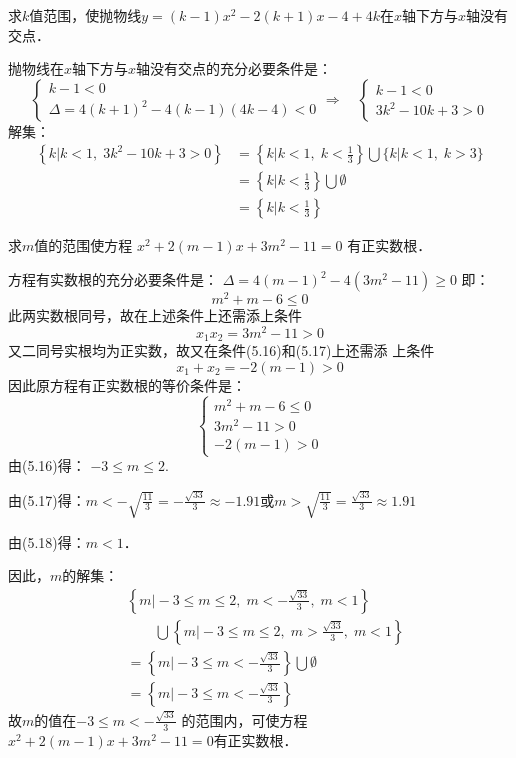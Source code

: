 \begin{example}
    求$k$值范围，使抛物线$y=(k-1)x^2-2(k+1)x-4+4k$在$x$轴下方与$x$轴没有交点．
\end{example}

\begin{solution}
    抛物线在$x$轴下方与$x$轴没有交点的充分必要条件是：
\[\begin{cases}
    k-1<0 \\ \Delta=4(k+1)^2-4(k-1)(4k-4)<0
\end{cases}\Rightarrow \quad \begin{cases}
    k-1<0 \\ 3k^2-10k+3>0
\end{cases}\]
解集：
\[\begin{split}
\left\{k|k<1,\; 3k^2-10k+3>0 \right\}&=\left\{k\Big|k<1,\; k<\frac{1}{3} \right\}\bigcup\{k|k<1,\; k>3 \}\\
&=\left\{k\Big|k<\frac{1}{3} \right\}\bigcup\emptyset\\
&=\left\{k\Big|k<\frac{1}{3} \right\}
\end{split}\]
\end{solution}

\begin{example}
    求$m$值的范围使方程
    $x^2+2(m-1)x+3m^2-11=0$
    有正实数根．
\end{example}

\begin{solution}
方程有实数根的充分必要条件是：
$\Delta=4(m-1)^2-4(3m^2-11)\ge 0$
即：
\begin{equation}
    m^2+m-6\le 0
\end{equation}
此两实数根同号，故在上述条件上还需添上条件
\begin{equation}
    x_1x_2=3m^2-11>0
\end{equation}
又二同号实根均为正实数，故又在条件(5.16)和(5.17)上还需添
上条件
\begin{equation}
    x_1+x_2=-2(m-1)>0
\end{equation}
因此原方程有正实数根的等价条件是：
\[\begin{cases}
    m^2+m-6\le 0\\
    3m^2-11>0\\
    -2(m-1)>0
\end{cases}\]
由(5.16)得：
$-3\le m\le 2$.

由(5.17)得：$m<-\sqrt{\frac{11}{3}}=-\frac{\sqrt{33}}{3}\approx -1.91$或$m>\sqrt{\frac{11}{3}}=\frac{\sqrt{33}}{3}\approx 1.91$

由(5.18)得：$m<1$．

因此，$m$的解集：
\[\begin{split}
   & \left\{m\Big|-3\le m\le 2,\; m<-\frac{\sqrt{33}}{3},\; m<1\right\}\\
   &\qquad \bigcup\left\{m\Big|-3\le m\le 2,\; m>\frac{\sqrt{33}}{3},\; m<1\right\}\\
    &=\left\{m\Big|-3\le m<-\frac{\sqrt{33}}{3}\right\}\bigcup \emptyset\\
    &=\left\{m\Big|-3\le m<-\frac{\sqrt{33}}{3}\right\}
\end{split}\]
故$m$的值在$-3\le m<-\frac{\sqrt{33}}{3}$
的范围内，可使方程$x^2+2(m-1)x+3m^2-11=0$有正实数根．
\end{solution}

